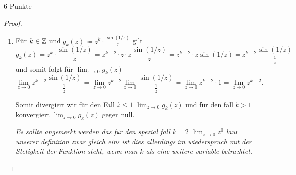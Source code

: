 \documentclass{problemset}
\begin{document}
\begin{problem}[Grenzwerte]{6 Punkte}
\begin{proof}
\begin{enumerate}
        \item Für $k \in \mathbb{Z}$ und $g_k(z) \coloneqq z^k \cdot \frac{\sin(1/z)}{z}$ gilt \[
                  g_k(z) = z^k \cdot \frac{\sin(1/z)}{z} = z^{k - 2} \cdot z \cdot z \frac{\sin(1/z)}{z} = z^{k - 2} \cdot z \sin(1/z) = z^{k - 2} \frac{\sin(1/z)}{\frac{1}{z}}
              \] und somit folgt für $\lim_{ z \to 0} g_k(z)$ \[
                  \lim_{z \to 0} z^{k - 2} \frac{\sin(1/z)}{\frac{1}{z}} = \lim_{z \to 0} z^{k - 2} \lim_{z \to 0} \frac{\sin(1/z)}{\frac{1}{z}} = \lim_{z \to 0} z^{k - 2} \cdot 1 = \lim_{z \to 0} z^{k - 2}.
              \]

              Somit divergiert wir für den Fall $k \le 1$ $\lim_{z \to 0} g_k(z)$ und für den fall $k > 1$ konvergiert $\lim_{z \to 0} g_k(z)$ gegen null.

              \textit{Es sollte angemerkt werden das für den spezial fall $k = 2$ $\lim_{z \to 0} z^0$ laut unserer definition zwar gleich eins ist dies allerdings im wiederspruch mit der Stetigkeit der Funktion steht,
                  wenn man $k$ als eine weitere variable betrachtet.}

    \end{enumerate}
\end{proof}
\end{problem}
\end{document}
